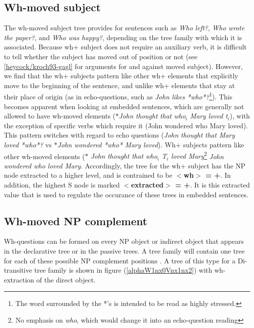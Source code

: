 \subsection{Wh-moved subject}

The wh-moved subject tree provides for sentences such as {\it Who left?}, {\it
Who wrote the paper?}, and {\it Who was happy?}, depending on the tree family
with which it is associated.  Because wh+ subject does not require an auxiliary
verb, it is difficult to tell whether the subject has moved out of position or
not (see \ref{heycock/kroch93-gagl} for arguments for and against moved subject).  However,
we find that the wh+ subjects pattern like other wh+ elements that explicitly
move to the beginning of the sentence, and unlike wh+ elements that stay at
their place of origin (as in echo-questions, such as {\it John likes
*who*?}\footnote{The word surrounded by the *'s is intended to be read as
highly stressed.}).  This becomes apparent when looking at embedded sentences,
which are generally not allowed to have wh-moved elements ($\ast${\it John
thought that who$_i$ Mary loved t$_i$}), with the exception of specific verbs
which require it (John wondered who Mary loved).  This pattern switches with
regard to echo questions ({\it John thought that Mary loved *who*?} vs
$\ast${\it John wondered *who* Mary loved}).  Wh+ subjects pattern like other
wh-moved elements ($\ast$ {\it John thought that who$_i$ T$_i$ loved
Mary}\footnote{No emphasis on {\it who}, which would change it into an
echo-question reading} {\it John wondered who loved Mary}.  Accordingly, the
tree for the wh+ subject has the NP node extracted to a higher level, and is
contrained to be {\bf $<$wh$>$ = +}.  In addition, the highest S node is marked
{\bf $<$extracted$>$ = +}.  It is this extracted value that is used to regulate
the occurance of these trees in embedded sentences.




\subsection{Wh-moved NP complement}
Wh-questions can be formed on every NP object or indirect object that
appears in the declarative tree or in the passive trees.  A tree
family will contain one tree for each of these possible NP complement positions
. A tree of this type for a
Di-transitive tree family is shown in figure (\ref{alphaW1nx0Vnx1nx2}) with wh-extraction of the
direct object. 

\begin{figure}[htbp]
\end{figure}

